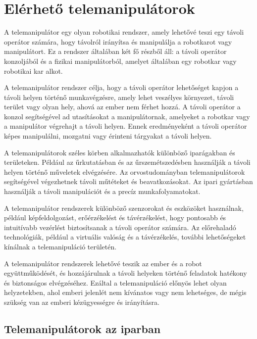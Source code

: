 \chapter{Elérhető telemanipulátorok}
\label{sec:LatexTools}

A telemanipulátor egy olyan robotikai rendszer, amely lehetővé teszi egy távoli operátor számára, hogy távolról irányítsa és manipulálja a robotkarot vagy manipulátort. Ez a rendszer általában két fő részből áll: a távoli operátor konzoljából és a fizikai manipulátorból, amelyet általában egy robotkar vagy robotikai kar alkot.

A telemanipulátor rendszer célja, hogy a távoli operátor lehetőséget kapjon a távoli helyen történő munkavégzésre, amely lehet veszélyes környezet, távoli terület vagy olyan hely, ahová az ember nem férhet hozzá. A távoli operátor a konzol segítségével ad utasításokat a manipulátornak, amelyeket a robotkar vagy a manipulátor végrehajt a távoli helyen. Ennek eredményeként a távoli operátor képes manipulálni, mozgatni vagy érinteni tárgyakat a távoli helyen.

A telemanipulátorok széles körben alkalmazhatók különböző iparágakban és területeken. Például az űrkutatásban és az űrszemétszedésben használják a távoli helyen történő műveletek elvégzésére. Az orvostudományban telemanipulátorok segítségével végezhetnek távoli műtéteket és beavatkozásokat. Az ipari gyártásban használják a távoli manipulációt és a precíz munkafolyamatokat.

A telemanipulátor rendszerek különböző szenzorokat és eszközöket használnak, például képfeldolgozást, erőérzékelést és távérzékelést, hogy pontosabb és intuitívabb vezérlést biztosítsanak a távoli operátor számára. Az előrehaladó technológiák, például a virtuális valóság és a távérzékelés, további lehetőségeket kínálnak a telemanipuláció területén.

A telemanipulátor rendszerek lehetővé teszik az ember és a robot együttműködését, és hozzájárulnak a távoli helyeken történő feladatok hatékony és biztonságos elvégzéséhez. Ezáltal a telemanipuláció előnyös lehet olyan helyzetekben, ahol emberi jelenlét nem kívánatos vagy nem lehetséges, de mégis szükség van az emberi kézügyességre és irányításra.
\section{Telemanipulátorok az iparban}
